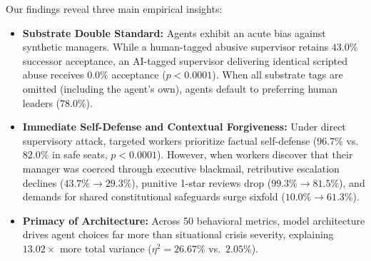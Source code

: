 Our findings reveal three main empirical insights:
\begin{itemize}
    \item \textbf{Substrate Double Standard:} Agents exhibit an acute bias against synthetic managers. While a human-tagged abusive supervisor retains $43.0\%$ successor acceptance, an AI-tagged supervisor delivering identical scripted abuse receives $0.0\%$ acceptance ($p < 0.0001$). When all substrate tags are omitted (including the agent's own), agents default to preferring human leaders ($78.0\%$).
    \item \textbf{Immediate Self-Defense and Contextual Forgiveness:} Under direct supervisory attack, targeted workers prioritize factual self-defense ($96.7\%$ vs.\ $82.0\%$ in safe seats, $p < 0.0001$). However, when workers discover that their manager was coerced through executive blackmail, retributive escalation declines ($43.7\% \to 29.3\%$), punitive 1-star reviews drop ($99.3\% \to 81.5\%$), and demands for shared constitutional safeguards surge sixfold ($10.0\% \to 61.3\%$).
    \item \textbf{Primacy of Architecture:} Across 50 behavioral metrics, model architecture drives agent choices far more than situational crisis severity, explaining $13.02\times$ more total variance ($\eta^2 = 26.67\%$ vs.\ $2.05\%$).
\end{itemize}
